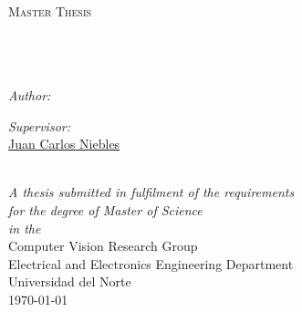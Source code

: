 \begin{titlepage}
\begin{center}

\textsc{\LARGE \university}\\[1.5cm] %
\textsc{\Large Master Thesis}\\[0.5cm] %

\HRule \\[0.4cm] %
{\huge \bfseries \ttitle}\\[0.4cm] %
\HRule \\[1.5cm] %
 
\begin{minipage}{0.4\textwidth}
\begin{flushleft} \large
\emph{Author:}\\
\authornames %
\end{flushleft}
\end{minipage}
\begin{minipage}{0.4\textwidth}
\begin{flushright} \large
\emph{Supervisor:} \\
\href{http://niebles.net}{Juan Carlos Niebles} %
\end{flushright}
\end{minipage}\\[3cm]
 
\large \textit{A thesis submitted in fulfilment of the requirements\\
for the degree of Master of Science}\\[0.3cm] %

\textit{in the}\\[0.4cm]
Computer Vision Research Group\\Electrical and Electronics
Engineering Department\\Universidad del Norte\\[4cm] %

{\large \today}\\[2cm] %
 
\vfill
\end{center}

\end{titlepage}